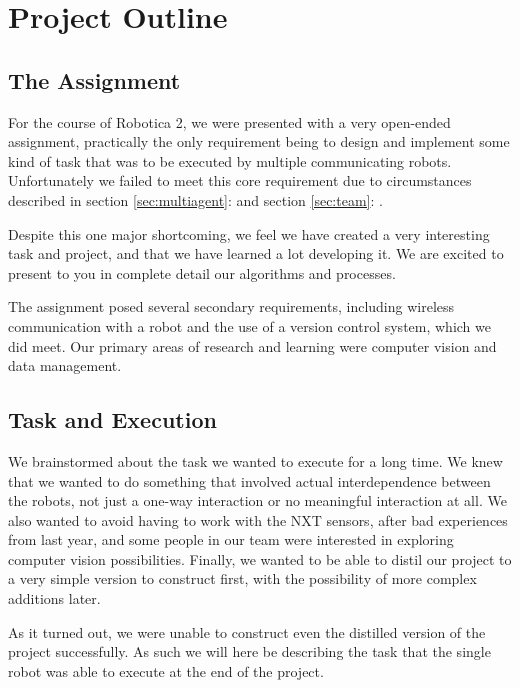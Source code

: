 \documentclass[10pt, abstracton, twocolumn]{scrartcl}
\newcommand{\sref}[1]{section \vref{#1}: \nameref{#1}}
\begin{document}
\clearpage

\thispagestyle{empty} %

\tableofcontents

\clearpage

\twocolumn

\section{Project Outline}

\subsection{The Assignment}
For the course of Robotica 2, we were presented with a very open-ended assignment, practically the only requirement being to design and implement some kind of task that was to be executed by multiple communicating robots. Unfortunately we failed to meet this core requirement due to circumstances described in \sref{sec:multiagent} and \sref{sec:team}.

Despite this one major shortcoming, we feel we have created a very interesting task and project, and that we have learned a lot developing it. We are excited to present to you in complete detail our algorithms and processes.

The assignment posed several secondary requirements, including wireless communication with a robot and the use of a version control system, which we did meet. Our primary areas of research and learning were computer vision and data management.

\subsection{Task and Execution}
We brainstormed about the task we wanted to execute for a long time. We knew that we wanted to do something that involved actual interdependence between the robots, not just a one-way interaction or no meaningful interaction at all. We also wanted to avoid having to work with the NXT sensors, after bad experiences from last year, and some people in our team were interested in exploring computer vision possibilities. Finally, we wanted to be able to distil our project to a very simple version to construct first, with the possibility of more complex additions later.

As it turned out, we were unable to construct even the distilled version of the project successfully. As such we will here be describing the task that the single robot was able to execute at the end of the project.
\end{document}

